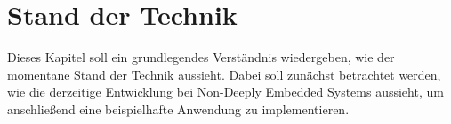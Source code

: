 \chapter{Stand der Technik}
\label{chap:standTechnik}
Dieses Kapitel soll ein grundlegendes Verständnis wiedergeben, wie der momentane Stand der
Technik aussieht. Dabei soll zunächst betrachtet werden, wie die
derzeitige Entwicklung bei Non-Deeply Embedded Systems aussieht, um anschließend eine
beispielhafte Anwendung zu implementieren.

